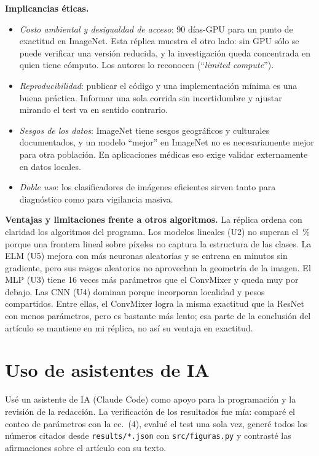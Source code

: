 \documentclass[11pt,a4paper]{article}
\newcommand{\pct}[1]{#1\,\%}
\begin{document}
\textbf{Implicancias éticas.}
\begin{itemize}
  \item \emph{Costo ambiental y desigualdad de acceso}: 90 días-GPU para un punto de exactitud en ImageNet. Esta
  réplica muestra el otro lado: sin GPU sólo se puede verificar una versión reducida, y la investigación queda
  concentrada en quien tiene cómputo. Los autores lo reconocen (``\emph{limited compute}'').
  \item \emph{Reproducibilidad}: publicar el código y una implementación mínima es una buena práctica. Informar una
  sola corrida sin incertidumbre y ajustar mirando el test va en sentido contrario.
  \item \emph{Sesgos de los datos}: ImageNet tiene sesgos geográficos y culturales documentados, y un modelo
  ``mejor'' en ImageNet no es necesariamente mejor para otra población. En aplicaciones médicas eso exige validar
  externamente en datos locales.
  \item \emph{Doble uso}: los clasificadores de imágenes eficientes sirven tanto para diagnóstico como para
  vigilancia masiva.
\end{itemize}

\textbf{Ventajas y limitaciones frente a otros algoritmos.} La réplica ordena con claridad los algoritmos del
programa. Los modelos lineales (U2) no superan el \pct{\accLineal} porque una frontera lineal sobre píxeles no
captura la estructura de las clases. La ELM (U5) mejora con más neuronas aleatorias y se entrena en minutos sin
gradiente, pero sus rasgos aleatorios no aprovechan la geometría de la imagen. El MLP (U3) tiene 16 veces más
parámetros que el ConvMixer y queda muy por debajo. Las CNN (U4) dominan porque incorporan localidad y pesos
compartidos. Entre ellas, el ConvMixer logra la misma exactitud que la ResNet con menos parámetros, pero es bastante
más lento; esa parte de la conclusión del artículo se mantiene en mi réplica, no así su ventaja en exactitud.

\section*{Uso de asistentes de IA}
Usé un asistente de IA (Claude Code) como apoyo para la programación y la revisión de la redacción. La
verificación de los resultados fue mía: comparé el conteo de parámetros con la ec.~(4), evalué el test una sola vez,
generé todos los números citados desde \texttt{results/*.json} con \texttt{src/figuras.py} y contrasté las
afirmaciones sobre el artículo con su texto.
\end{document}
